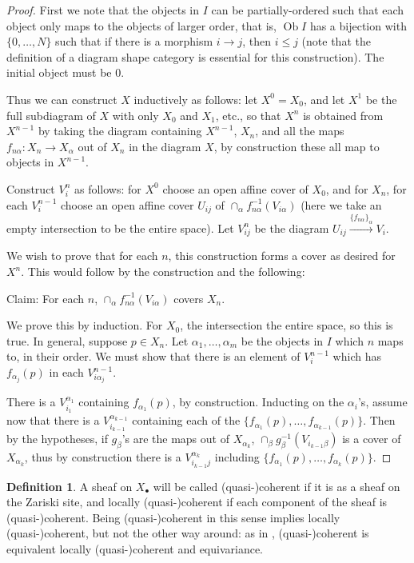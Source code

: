 \documentclass[proquest]{uwthesis}[2014/11/13]
\theoremstyle{definition}
\newtheorem{definition}[theorem]{Definition}
\DeclareMathOperator{\Ob}{Ob}
\begin{document}
\begin{proof}
	First we note that the objects in $I$ can be partially-ordered such that each object only maps to the objects of larger order, that is, $\Ob I$ has a bijection with $\{0, \dots, N\}$ such that if there is a morphism $i \rightarrow j$, then $i \leq j$ (note that the definition of a diagram shape category is essential for this construction).
	The initial object must be 0.
	
	Thus we can construct $X$ inductively as follows: let $X^0 = X_0$, and let $X^1$ be the full subdiagram of $X$ with only $X_0$ and $X_1$, etc., so that $X^n$ is obtained from $X^{n-1}$ by taking the diagram containing $X^{n-1}$, $X_n$, and all the maps $f_{n\alpha}:X_n \rightarrow X_\alpha$ out of $X_n$ in the diagram $X$, by construction these all map to objects in $X^{n-1}$.
	
	Construct $V_i^n$ as follows: for $X^0$ choose an open affine cover of $X_0$, and for $X_n$, for each $V_i^{n-1}$ choose an open affine cover $U_{ij}$ of $\cap_\alpha f_{n\alpha}^{-1}(V_{i\alpha})$ (here we take an empty intersection to be the entire space).
	Let $V_{ij}^n$ be the diagram $U_{ij} \xrightarrow{\{f_{n\alpha}\}_\alpha} V_i$.
	
	We wish to prove that for each $n$, this construction forms a cover as desired for $X^n$.
	This would follow by the construction and the following:
	
	Claim: For each $n$, $\cap_\alpha f_{n\alpha}^{-1}(V_{i\alpha})$ covers $X_n$.
	
	We prove this by induction.
	For $X_0$, the intersection the entire space, so this is true.
	In general, suppose $p \in X_n$.
	Let $\alpha_1, \dots, \alpha_m$ be the objects in $I$ which $n$ maps to, in their order.
	We must show that there is an element of $V_i^{n-1}$ which has $f_{\alpha_j}(p)$ in each $V_{i \alpha_j}^{n-1}$.
	
	There is a $V_{i_1}^{\alpha_1}$ containing $f_{\alpha_1}(p)$, by construction.
	Inducting on the $\alpha_i$'s, assume now that there is a $V_{i_{k-1}}^{\alpha_{k-1}}$ containing each of the $\{f_{\alpha_1}(p), \dots, f_{\alpha_{k-1}}(p)\}$.
	Then by the hypotheses, if $g_\beta$'s are the maps out of $X_{\alpha_k}$, $\cap_\beta g_{\beta}^{-1}(V_{i_{k-1}\beta})$ is a cover of $X_{\alpha_k}$, thus by construction there is a $V_{i_{k-1}j}^{\alpha_k}$ including $\{f_{\alpha_1}(p), \dots, f_{\alpha_{k}}(p)\}$.
\end{proof}

\begin{definition}
	A sheaf on $X_\bullet$ will be called (quasi-)coherent if it is as a sheaf on the Zariski site, and locally (quasi-)coherent if each component of the sheaf is (quasi-)coherent. 
	Being (quasi-)coherent in this sense implies locally (quasi-)coherent, but not the other way around:
	as in \cite[II 7.3]{Lipman2009}, (quasi-)coherent is equivalent locally (quasi-)coherent and equivariance.
\end{definition}
\end{document}

